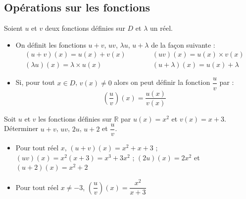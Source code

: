 \documentclass[french]{book}
\newcommand{\R}{\mathbb {R}}
\begin{document}
%
\subsection{Opérations sur les fonctions}
\begin{defn}
Soient $u$ et $v$ deux fonctions définies sur $D$ et $\lambda$ un réel.
\begin{itemize}
\item On définit les fonctions $u+v$, $uv$, $\lambda u$, $u+\lambda$ de la façon suivante :
\[\begin{array}{l}
(u+v)(x)=u(x)+v(x) \\
(\lambda u)(x)=\lambda \times u(x)
\end{array}
\hspace{3em}
\begin{array}{l}
(uv)(x)=u(x)\times v(x) \\
(u+\lambda)(x)=u(x)+\lambda
\end{array}\]
\item Si, pour tout $x \in D$, $v(x)\neq 0$ alors on peut définir la fonction $\dfrac{u}{v}$ par :
\[\left(\dfrac{u}{v}\right)(x)=\dfrac{u(x)}{v(x)}\]

\end{itemize}
\end{defn}

\begin{exemple}
Soit $u$ et $v$ les fonctions définies sur $\R$ par $u(x)=x^{2}$ et $v(x)=x+3$. Déterminer $u+v$, $uv$, $2u$, $u+2$ et $\dfrac{u}{v}$.
\end{exemple}


\begin{itemize}
\item Pour tout réel $x$, $(u+v)(x)=x^{2}+x+3$ ; $(uv)(x)=x^{2}(x+3)=x^{3}+3x^{2}$ ; $(2u)(x)=2x^{2}$ et $(u+2)(x)=x^{2}+2$
\item Pour tout réel $x \neq -3$, $\left(\dfrac{u}{v}\right)(x)=\dfrac{x^{2}}{x+3}$
\end{itemize}

%
\end{document}
